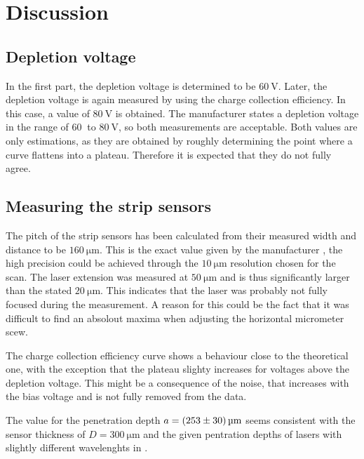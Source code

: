 \section{Discussion}
\label{sec:Discussion}

\subsection{Depletion voltage}

In the first part, the depletion voltage is determined to be $\qty{60}{\volt}$.
Later, the depletion voltage is again measured by using the charge collection efficiency.
In this case, a value of $\qty{80}{\volt}$ is obtained. The manufacturer \cite{V15} states a depletion
voltage in the range of $\qty{60}{}$ to $\qty{80}{\volt}$, so both measurements are
acceptable. Both values are only estimations, as they are obtained by roughly determining the
point where a curve flattens into a plateau. Therefore it is expected that they do not fully agree.

\subsection{Measuring the strip sensors}

The pitch of the strip sensors has been calculated from their measured width and distance to be
$\qty{160}{\micro\meter}$. This is the exact value given by the manufacturer \cite{V15}, the high
precision could be achieved through the $\qty{10}{\micro\meter}$ resolution chosen for the scan.
The laser extension was measured at $\qty{50}{\micro\meter}$ and is thus significantly larger
than the stated \cite{V15} $\qty{20}{\micro\meter}$. This indicates that the laser was probably not
fully focused during the measurement. A reason for this could be the fact that it was difficult to find an
absolout maxima when adjusting the horizontal micrometer scew.

The charge collection efficiency curve shows a behaviour close to the theoretical one, with the
exception that the plateau slighty increases for voltages above the depletion voltage. This might be
a consequence of the noise, that increases with the bias voltage and is not fully removed from the data.

The value for the penetration depth $ a= \qty{253+-30}{\micro\meter}$ seems consistent with the sensor
thickness of $D = \qty{300}{\micro\meter}$ and the given pentration depths of lasers with slightly different
wavelenghts in \cite{V15}.

